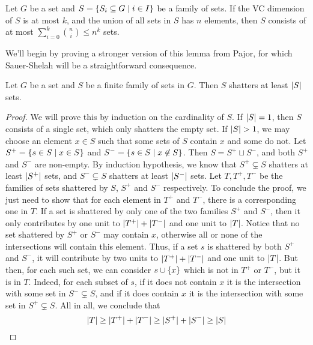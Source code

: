     \begin{lemma} \label{lem:sauer-shelah}
        Let $G$ be a set and $S = \{ S_i \subseteq G \mid i \in I \}$ be a family of sets.
        If the VC dimension of $S$ is at most $k$, and the union of all sets in $S$ has $n$ elements, then
        $S$ consists of at most $\sum_{i=0}^{k} \binom{n}{i} \leq n^k$ sets.
    \end{lemma}

    We'll begin by proving a stronger version of this lemma from Pajor, for which Sauer-Shelah will be a straightforward
    consequence.

    \begin{lemma} \label{lem:pajor}
        Let $G$ be a set and $S$ be a finite family of sets in $G$.
        Then $S$ shatters at least $| S |$ sets.
        \begin{proof}
            We will prove this by induction on the cardinality of $S$.
            If $| S | = 1$, then $S$ consists of a single set, which only shatters the empty set.
            If $| S | > 1$, we may choose an element $x \in S$ such that some sets of $S$ contain $x$ and some do not.
            Let $S^+ = \{ s \in S \mid x \in S \}$ and $S^- = \{ s \in S \mid x \not\in S \}$.
            Then $S = S^+ \sqcup S^-$, and both $S^+$ and $S^-$ are non-empty.
            By induction hypothesis, we know that $S^+ \subsetneq S$ shatters at least $| S^+ |$ sets,
            and $S^- \subsetneq S$ shatters at least $| S^- |$ sets.
            Let $T, T^+, T^-$ be the families of sets shattered by $S$, $S^+$ and $S^-$ respectively.
            To conclude the proof, we just need to show that for each element in $T^+$ and $T^-$, there is a corresponding
            one in $T$.
            If a set is shattered by only one of the two families $S^+$ and $S^-$, then it only contributes by one unit
            to $| T^+ | + | T^- |$ and one unit to $| T |$.
            Notice that no set shattered by $S^+$ or $S^-$ may contain $x$, otherwise all or none of the intersections
            will contain this element.
            Thus, if a set $s$ is shattered by both $S^+$ and $S^-$, it will contribute by two units to
            $| T^+ | + | T^- |$ and one unit to $| T |$.
            But then, for each such set, we can consider $s \cup \{ x \}$ which is not in $T^+$ or $T^-$, but it is in $T$.
            Indeed, for each subset of $s$, if it does not contain $x$ it is the intersection with some
            set in $S^- \subsetneq S$, and if it does contain $x$ it is the intersection with some set in $S^+ \subsetneq S$.
            All in all, we conclude that
            \[
                | T | \geq | T^+ | + | T^- | \geq | S^+ | + | S^- |
                                \geq | S |
            \]
        \end{proof}
    \end{lemma}

